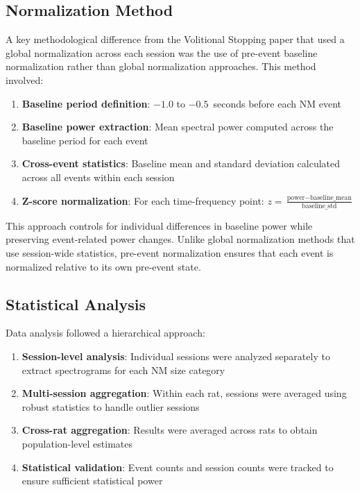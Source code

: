 \documentclass[11pt]{article}
\begin{document}
\subsection{Normalization Method}

A key methodological difference from the Volitional Stopping paper that used a global normalization across each session was the use of pre-event baseline normalization rather than global normalization approaches. This method involved:

\begin{enumerate}
\item \textbf{Baseline period definition}: $-1.0$ to $-0.5$~seconds before each NM event
\item \textbf{Baseline power extraction}: Mean spectral power computed across the baseline period for each event
\item \textbf{Cross-event statistics}: Baseline mean and standard deviation calculated across all events within each session
\item \textbf{Z-score normalization}: For each time-frequency point: $z = \frac{\text{power} - \text{baseline\_mean}}{\text{baseline\_std}}$
\end{enumerate}

This approach controls for individual differences in baseline power while preserving event-related power changes. Unlike global normalization methods that use session-wide statistics, pre-event normalization ensures that each event is normalized relative to its own pre-event state.

\subsection{Statistical Analysis}

Data analysis followed a hierarchical approach:

\begin{enumerate}
\item \textbf{Session-level analysis}: Individual sessions were analyzed separately to extract spectrograms for each NM size category
\item \textbf{Multi-session aggregation}: Within each rat, sessions were averaged using robust statistics to handle outlier sessions
\item \textbf{Cross-rat aggregation}: Results were averaged across rats to obtain population-level estimates
\item \textbf{Statistical validation}: Event counts and session counts were tracked to ensure sufficient statistical power
\end{enumerate}
\end{document}
